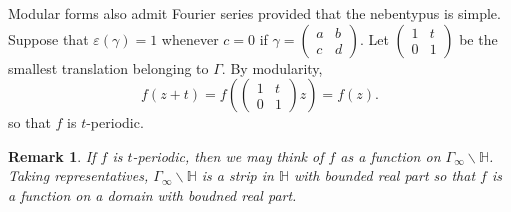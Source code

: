 \documentclass[12pt]{book}
\newtheorem{remark}{Remark}[section]
\theoremstyle{definition}\newframedtheorem{method}{Method}
\renewcommand{\H}{\mathbb{H}}
\newcommand{\g}{\gamma}
\newcommand{\G}{\Gamma}
\newcommand{\e}{\varepsilon}
\newcommand{\<}{\langle}
\renewcommand{\>}{\rangle}
\begin{document}
      Modular forms also admit Fourier series provided that the nebentypus is simple. Suppose that $\e(\g) = 1$ whenever $c = 0$ if $\g = \begin{pmatrix} a & b \\ c & d \end{pmatrix}$. Let $\begin{pmatrix} 1 & t \\ 0 & 1 \end{pmatrix}$ be the smallest translation belonging to $\G$. By modularity,
      \[
        f(z+t) = f\left(\begin{pmatrix} 1 & t \\ 0 & 1 \end{pmatrix}z\right) = f(z).
      \]
      so that $f$ is $t$-periodic.

      \begin{remark}
        If $f$ is $t$-periodic, then we may think of $f$ as a function on $\G_{\infty}\backslash\H$. Taking representatives, $\G_{\infty}\backslash\H$ is a strip in $\H$ with bounded real part so that $f$ is a function on a domain with boudned real part.
      \end{remark}
\end{document}
